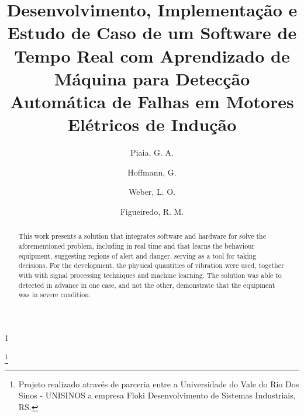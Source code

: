 \documentclass[a4paper]{ifacconf}
\def\portugues{1}
\def\portugues{0}
\begin{document}
	
	
\if\portugues1

% 
	
\begin{frontmatter}

\title{Desenvolvimento, Implementação e Estudo de Caso de um Software de Tempo Real com Aprendizado de Máquina
para Detecção Automática de Falhas em Motores Elétricos de Indução} 

\thanks[footnoteinfo]{Projeto realizado através de parceria entre a Universidade do Vale do Rio Dos Sinos - 
UNISINOS a empresa Floki Desenvolvimento de Sistemas Industriais, RS.}

\author[First]{Piaia, G. A.} 
\author[First]{Hoffmann, G.} 
\author[First]{Weber, L. O.}
\author[Second]{Figueiredo, R. M.}


\address[First]{Floki Desenvolvimento de Sistemas Industriais, RS (e-mails: piaia@flokisys.com; giu@flokisys.com; weber@flokisys.com).}
\address[Second]{Programa de Pós-Graduação em Engenharia Elétrica, Universidade do Vale do Rio Dos Sinos - 
UNISINOS, RS (e-mail: marquesf@unisinos.br).}


\renewcommand{\abstractname}{{\bf Abstract:~}}
\begin{abstract}                %
                        This work presents a solution that integrates software and hardware for solve the aforementioned problem,
                        including in real time and that learns the behaviour equipment, suggesting regions of alert and
                        danger, serving as a tool for taking decisions. For the development, the physical quantities of
                        vibration were used, together with with signal processing techniques and machine learning. 
                        The solution was able to detected in advance in one case, and not the other, demonstrate that the equipment was in
                        severe condition.


\end{abstract}
\end{frontmatter}
\end{document}
